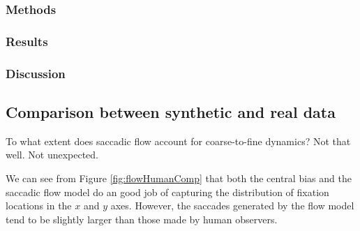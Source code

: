 \documentclass[a4paper, twocolumn, oneside, 10pt]{article}
\begin{document}
\subsubsection{Methods}

\subsubsection{Results}

\subsubsection{Discussion}


\subsection{Comparison between synthetic and real data}
\label{sec:humanComp}
To what extent does saccadic flow account for coarse-to-fine dynamics? Not that well. Not unexpected.

We can see from Figure \ref{fig:flowHumanComp} that both the central bias and the saccadic flow model do an good job of capturing the distribution of fixation locations in the $x$ and $y$ axes. However, the saccades generated by the flow model tend to be slightly larger than those made by human observers. 
\end{document}
